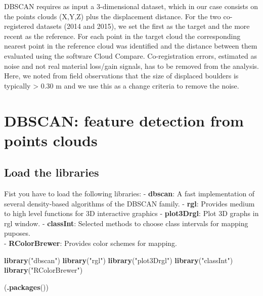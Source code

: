 \documentclass[
]{book}
\newenvironment{Shaded}{\begin{snugshade}}{\end{snugshade}}
\newcommand{\FunctionTok}[1]{\textcolor[rgb]{0.13,0.29,0.53}{\textbf{#1}}}
\newcommand{\NormalTok}[1]{#1}
\newcommand{\StringTok}[1]{\textcolor[rgb]{0.31,0.60,0.02}{#1}}
\begin{document}
DBSCAN requires as input a 3-dimensional dataset, which in our case consists on the points clouds (X,Y,Z) plus the displacement distance.
For the two co-registered datasets (2014 and 2015), we set the first as the target and the more recent as the reference.
For each point in the target cloud the corresponding nearest point in the reference cloud was identified and the distance between them evaluated using the software Cloud Compare.
Co-registration errors, estimated as noise and not real material loss/gain signals, has to be removed from the analysis.
Here, we noted from field observations that the size of displaced boulders is typically \textgreater{} 0.30 m and we use this as a change criteria to remove the noise.

\hypertarget{dbscan-feature-detection-from-points-clouds}{%
\section{DBSCAN: feature detection from points clouds}\label{dbscan-feature-detection-from-points-clouds}}

\hypertarget{load-the-libraries-2}{%
\subsection{Load the libraries}\label{load-the-libraries-2}}

Fist you have to load the following libraries: - \textbf{dbscan}: A fast implementation of several density-based algorithms of the DBSCAN family.
- \textbf{rgl}: Provides medium to high level functions for 3D interactive graphics - \textbf{plot3Drgl}: Plot 3D graphs in rgl window.
- \textbf{classInt}: Selected methods to choose class intervals for mapping puposes.\\
- \textbf{RColorBrewer}: Provides color schemes for mapping.

\begin{Shaded}
\begin{Highlighting}[]
\FunctionTok{library}\NormalTok{(}\StringTok{"dbscan"}\NormalTok{)}
\FunctionTok{library}\NormalTok{(}\StringTok{"rgl"}\NormalTok{)}
\FunctionTok{library}\NormalTok{(}\StringTok{"plot3Drgl"}\NormalTok{)}
\FunctionTok{library}\NormalTok{(}\StringTok{"classInt"}\NormalTok{)}
\FunctionTok{library}\NormalTok{(}\StringTok{"RColorBrewer"}\NormalTok{)}

\NormalTok{(}\FunctionTok{.packages}\NormalTok{())}
\end{Highlighting}
\end{Shaded}
\end{document}
